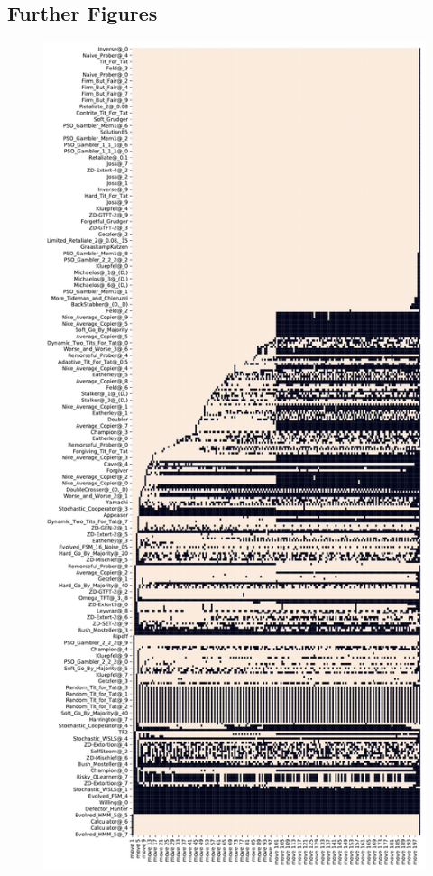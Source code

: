 \begin{appendices}
\chapter{Further Figures}\label{apndx:figs}
\begin{figure}[ht]
    \centering
    \begin{minipage}{0.48\textwidth}
        \centering
        \includegraphics[width=1.0\textwidth, center]{./img/descriptive/sequence_plot_alphabetical_pt1.pdf}

\end{minipage}
\end{figure}
\end{appendices}
